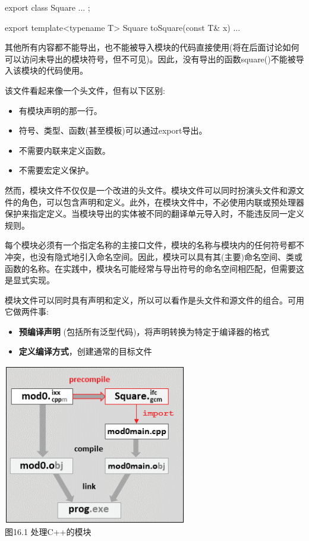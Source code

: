 \begin{cpp}
export class Square {
	...
};

export template<typename T>
Square toSquare(const T& x) {
	...
}
\end{cpp}

其他所有内容都不能导出，也不能被导入模块的代码直接使用(将在后面讨论如何可以访问未导出的模块符号，但不可见)。因此，没有导出的函数square()不能被导入该模块的代码使用。

该文件看起来像一个头文件，但有以下区别:

\begin{itemize}
\item 
有模块声明的那一行。

\item 
符号、类型、函数(甚至模板)可以通过export导出。

\item 
不需要内联来定义函数。

\item 
不需要宏定义保护。
\end{itemize}

然而，模块文件不仅仅是一个改进的头文件。模块文件可以同时扮演头文件和源文件的角色，可以包含声明和定义。此外，在模块文件中，不必使用内联或预处理器保护来指定定义。当模块导出的实体被不同的翻译单元导入时，不能违反同一定义规则。

每个模块必须有一个指定名称的主接口文件，模块的名称与模块内的任何符号都不冲突，也没有隐式地引入命名空间。因此，模块可以具有其(主要)命名空间、类或函数的名称。在实践中，模块名可能经常与导出符号的命名空间相匹配，但需要这是显式实现。


模块文件可以同时具有声明和定义，所以可以看作是头文件和源文件的组合。可用它做两件事:

\begin{itemize}
\item 
\textbf{预编译声明} (包括所有泛型代码)，将声明转换为特定于编译器的格式

\item 
\textbf{定义编译方式}，创建通常的目标文件
\end{itemize}

\begin{center}
\includegraphics[width=0.6\textwidth]{content/chapter16/images/1.png}\\
图16.1 处理C++的模块
\end{center}

